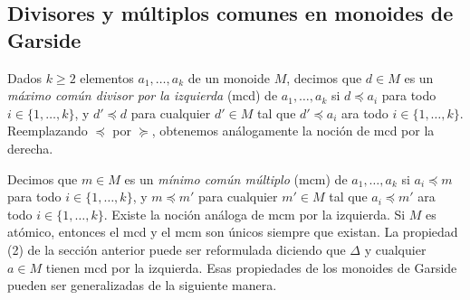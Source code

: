 \documentclass[12pt]{book}
\theoremstyle{definition}
\begin{document}
\subsection{Divisores y múltiplos comunes en monoides de Garside}

Dados $k\geq 2$ elementos $a_1,\ldots,a_k$ de un monoide $M$, decimos que $d\in M$ es un \textit{máximo común divisor por la izquierda} (mcd) de $a_1,\ldots,a_k$ si $d\preceq a_i$ para todo $i\in\{1,\ldots,k\}$, y $d'\preceq d$ para cualquier $d'\in M$ tal que $d'\preceq a_i$ ara todo $i\in\{1,\ldots,k\}$. Reemplazando $\preceq$ por $\succeq$, obtenemos análogamente la noción de mcd por la derecha.

Decimos que $m\in M$ es un \textit{mínimo común múltiplo} (mcm) de $a_1,\ldots,a_k$ si $a_i\preceq m$ para todo $i\in\{1,\ldots,k\}$, y $m\preceq m'$ para cualquier $m'\in M$ tal que $a_i\preceq m'$ ara todo $i\in\{1,\ldots,k\}$. Existe la noción análoga de mcm por la izquierda. Si $M$ es atómico, entonces el mcd y el mcm son únicos siempre que existan. La propiedad (2) de la sección anterior puede ser reformulada diciendo que $\Delta$ y cualquier $a\in M$ tienen mcd por la izquierda. Esas propiedades de los monoides de Garside pueden ser generalizadas de la siguiente manera.
\end{document}
